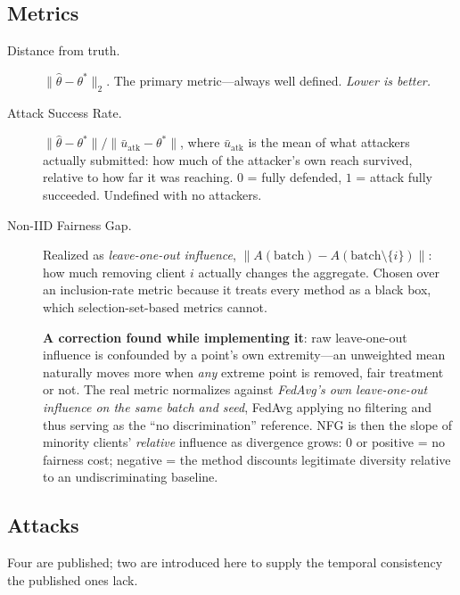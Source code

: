 \documentclass[11pt,a4paper]{article}
\begin{document}
\subsection{Metrics}

\begin{description}
  \item[Distance from truth.] $\lVert \hat\theta - \theta^{*}\rVert_2$.
    The primary metric---always well defined. \emph{Lower is better.}

  \item[Attack Success Rate.]
    $\lVert \hat\theta - \theta^{*}\rVert / \lVert \bar u_{\text{atk}} -
    \theta^{*}\rVert$, where $\bar u_{\text{atk}}$ is the mean of what
    attackers actually submitted: how much of the attacker's own reach
    survived, relative to how far it was reaching. $0$ = fully defended,
    $1$ = attack fully succeeded. Undefined with no attackers.

  \item[Non-IID Fairness Gap.] Realized as \emph{leave-one-out influence},
    $\lVert A(\text{batch}) - A(\text{batch} \setminus \{i\})\rVert$: how
    much removing client $i$ actually changes the aggregate. Chosen over
    an inclusion-rate metric because it treats every method as a black
    box, which selection-set-based metrics cannot.

    \textbf{A correction found while implementing it}: raw leave-one-out
    influence is confounded by a point's own extremity---an unweighted
    mean naturally moves more when \emph{any} extreme point is removed,
    fair treatment or not. The real metric normalizes against
    \emph{FedAvg's own leave-one-out influence on the same batch and
    seed}, FedAvg applying no filtering and thus serving as the
    ``no discrimination'' reference. NFG is then the slope of minority
    clients' \emph{relative} influence as divergence grows: $0$ or
    positive = no fairness cost; negative = the method discounts
    legitimate diversity relative to an undiscriminating baseline.
\end{description}

\subsection{Attacks}
\label{sec:attacks}

Four are published; two are introduced here to supply the temporal
consistency the published ones lack.
\end{document}
